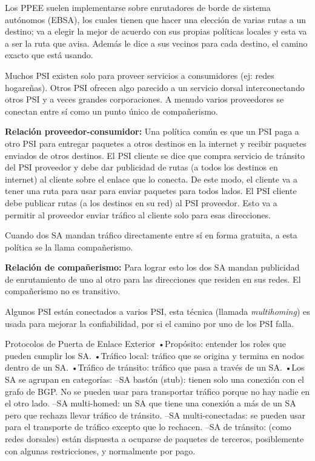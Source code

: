 \documentclass[10pt,a4paper]{report}
\begin{document}
	\par Los PPEE suelen implementarse sobre enrutadores de borde de sistema 
   autónomos (EBSA), los cuales tienen que hacer una elección de varias rutas a un 
   destino; va a elegir la mejor de acuerdo con sus propias políticas locales y esta va a 
   ser la ruta que avisa. Además le dice a sus vecinos para cada destino, el camino 
   exacto que está usando.
   
	\par Muchos PSI existen solo para proveer servicios a consumidores (ej: redes 
	hogareñas). Otros PSI ofrecen algo parecido a un servicio dorsal interconectando 
	otros PSI y a veces grandes corporaciones. A menudo varios proveedores se 
	conectan entre sí como un punto único de compañerismo.
	
	\par \textbf{Relación proveedor-consumidor:} Una política común es que un PSI paga a otro PSI para entregar paquetes a otros destinos en la internet y recibir paquetes enviados de otros destinos. El PSI cliente se dice que compra servicio de tránsito del PSI proveedor y debe dar publicidad de rutas (a todos los destinos en internet) al cliente sobre el enlace que lo conecta. De este modo, el cliente va a tener una ruta para usar para enviar paquetes para todos lados. El PSI cliente debe publicar rutas (a los destinos en su red) al PSI proveedor. Esto va a permitir al proveedor enviar tráfico al cliente solo para esas direcciones.

	\par Cuando dos SA mandan tráfico directamente entre sí en forma gratuita, a esta política se la llama compañerismo.
	
	\par \textbf{Relación de compañerismo:} Para lograr esto los dos SA mandan publicidad de enrutamiento de uno al otro para las direcciones que residen en sus redes. El compañerismo no es transitivo.

	\par Algunos PSI están conectados a varios PSI, esta técnica (llamada \textit{multihoming}) es usada para mejorar la confiabilidad, por si el camino por uno de los PSI falla.


Protocolos de Puerta de Enlace Exterior
•Propósito: entender los roles que pueden cumplir los SA.
•Tráfico local: tráfico que se origina y termina en nodos dentro de un SA.
•Tráfico de tránsito: tráfico que pasa a través de un SA.
•Los SA se agrupan en categorías:
–SA bastón (stub): tienen solo una conexión con el grafo de BGP. No se pueden usar para transportar tráfico porque no hay nadie en el otro lado.
–SA multi-homed: un SA que tiene una conexión a más de un SA pero que rechaza llevar tráfico de tránsito.
–SA multi-conectadas: se pueden usar para el transporte de tráfico excepto que lo rechacen.
–SA de tránsito: (como redes dorsales) están dispuesta a ocuparse de paquetes de terceros, posiblemente con algunas restricciones, y normalmente por pago.
\end{document}
